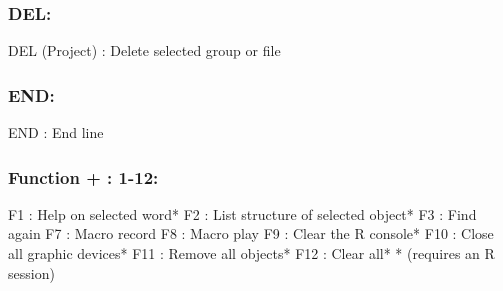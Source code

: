 
\subsubsection{DEL:}

\vspace{-0.5cm}
\begin{Rtables}[caption={[DEL keyboard shortcut]
    DEL keyboard shortcut},
  label=shortcut:del]
  DEL (Project)   : Delete selected group or file
\end{Rtables}


\subsubsection{END:}

\vspace{-0.5cm}
\begin{Rtables}[caption={[END keyboard shortcut]
    END keyboard shortcut},
  label=shortcut:end]
  END             : End line
\end{Rtables}


\subsubsection{Function + : 1-12:}

\vspace{-0.5cm}
\begin{Rtables}[caption={[Function + keyboard shortcuts]
    Function + keyboard shortcuts},
  label=shortcut:funplus]
  F1      : Help on selected word*
  F2      : List structure of selected object*
  F3      : Find again
  F7      : Macro record
  F8      : Macro play
  F9      : Clear the R console*
  F10     : Close all graphic devices*
  F11     : Remove all objects*
  F12     : Clear all*
  * (requires an R session)
\end{Rtables}


